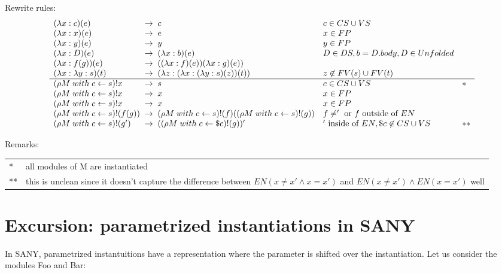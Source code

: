 \documentclass[a4paper]{article}
\begin{document}
Rewrite rules:\\

\[
\begin{array}{l@{\;\;\rightarrow\;\;}lll}
  (\lambda x : c)(e) &  c & c \in CS \cup VS & \\
  (\lambda x : x)(e) &  e & x \in FP &\\
  (\lambda x : y)(e) &  y & y \in FP&\\
  (\lambda x : D)(e) &  (\lambda x : b)(e) & D \in DS, b = D.body,
                                             D \in Unfolded&\\
  (\lambda x : f(g))(e) & ((\lambda x : f)(e))(\lambda x : g)(e)) &\\
  (\lambda x : \lambda y : s)(t)
                     & (\lambda z : (\lambda x : (\lambda y : s)(z))(t))
                          & z \not \in FV(s) \cup FV(t) &\\
  \hline
  (\rho M\; with\; c \leftarrow s)! x & s & c \in CS \cup VS & * \\
  (\rho M\; with\; c \leftarrow s)! x & x & x \in FP &\\
  (\rho M\; with\; c \leftarrow s)! x & x & x \in FP &\\
  (\rho M\; with\; c \leftarrow s)!(f(g))
                     & (\rho M\; with\; c \leftarrow s)!(f)
                       ((\rho M\; with\; c \leftarrow s)!(g) ) & f \neq '\mbox{ or }f\mbox{ outside of }EN  &\\
  (\rho M\; with\; c \leftarrow s)!(g')
                     & ((\rho M\; with\; c \leftarrow \$c)!(g) )' & '\mbox{ inside of }EN, \$c \not \in CS\cup VS  &**\\
  
\end{array}
\]

Remarks:\\
\begin{tabular}{ll}
  * & all modules of M are instantiated \\
  ** & this is unclean since it doesn't capture the difference between
       $EN (x\neq x' \land x=x')$ and $EN (x\neq x') \land EN (x=x')$ well\\
\end{tabular}

\section{Excursion: parametrized instantiations in SANY}
\label{sec:param-inst}

In SANY, parametrized instantuitions have a representation where the
 parameter is shifted over the instantiation. Let us consider the
 modules Foo and Bar:
\end{document}

